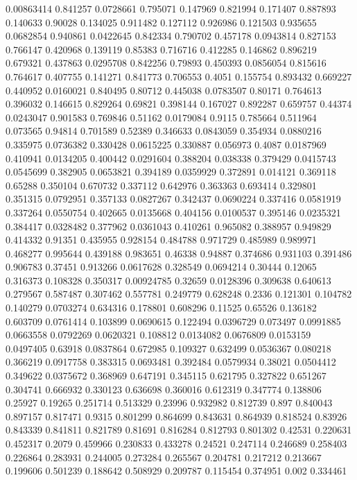 0.00863414 0.841257
0.0728661 0.795071
0.147969 0.821994
0.171407 0.887893
0.140633 0.90028
0.134025 0.911482
0.127112 0.926986
0.121503 0.935655
0.0682854 0.940861
0.0422645 0.842334
0.790702 0.457178
0.0943814 0.827153
0.766147 0.420968
0.139119 0.85383
0.716716 0.412285
0.146862 0.896219
0.679321 0.437863
0.0295708 0.842256
0.79893 0.450393
0.0856054 0.815616
0.764617 0.407755
0.141271 0.841773
0.706553 0.4051
0.155754 0.893432
0.669227 0.440952
0.0160021 0.840495
0.80712 0.445038
0.0783507 0.80171
0.764613 0.396032
0.146615 0.829264
0.69821 0.398144
0.167027 0.892287
0.659757 0.44374
0.0243047 0.901583
0.769846 0.51162
0.0179084 0.9115
0.785664 0.511964
0.073565 0.94814
0.701589 0.52389
0.346633 0.0843059
0.354934 0.0880216
0.335975 0.0736382
0.330428 0.0615225
0.330887 0.056973
0.4087 0.0187969
0.410941 0.0134205
0.400442 0.0291604
0.388204 0.038338
0.379429 0.0415743
0.0545699 0.382905
0.0653821 0.394189
0.0359929 0.372891
0.014121 0.369118
0.65288 0.350104
0.670732 0.337112
0.642976 0.363363
0.693414 0.329801
0.351315 0.0792951
0.357133 0.0827267
0.342437 0.0690224
0.337416 0.0581919
0.337264 0.0550754
0.402665 0.0135668
0.404156 0.0100537
0.395146 0.0235321
0.384417 0.0328482
0.377962 0.0361043
0.410261 0.965082
0.388957 0.949829
0.414332 0.91351
0.435955 0.928154
0.484788 0.971729
0.485989 0.989971
0.468277 0.995644
0.439188 0.983651
0.46338 0.94887
0.374686 0.931103
0.391486 0.906783
0.37451 0.913266
0.0617628 0.328549
0.0694214 0.30444
0.12065 0.316373
0.108328 0.350317
0.00924785 0.32659
0.0128396 0.309638
0.640613 0.279567
0.587487 0.307462
0.557781 0.249779
0.628248 0.2336
0.121301 0.104782
0.140279 0.0703274
0.634316 0.178801
0.608296 0.11525
0.65526 0.136182
0.603709 0.0761414
0.103899 0.0690615
0.122494 0.0396729
0.073497 0.0991885
0.0663558 0.0792269
0.0620321 0.108812
0.0134082 0.0676809
0.0153159 0.0497405
0.63918 0.0837864
0.672985 0.109327
0.632499 0.0536367
0.080218 0.366219
0.0917758 0.383315
0.0693481 0.392484
0.0579934 0.38021
0.0504412 0.349622
0.0375672 0.368969
0.647191 0.345115
0.621795 0.327822
0.651267 0.304741
0.666932 0.330123
0.636698 0.360016
0.612319 0.347774
0.138806 0.25927
0.19265 0.251714
0.513329 0.23996
0.932982 0.812739
0.897 0.840043
0.897157 0.817471
0.9315 0.801299
0.864699 0.843631
0.864939 0.818524
0.83926 0.843339
0.841811 0.821789
0.81691 0.816284
0.812793 0.801302
0.42531 0.220631
0.452317 0.2079
0.459966 0.230833
0.433278 0.24521
0.247114 0.246689
0.258403 0.226864
0.283931 0.244005
0.273284 0.265567
0.204781 0.217212
0.213667 0.199606
0.501239 0.188642
0.508929 0.209787
0.115454 0.374951
0.002 0.334461
